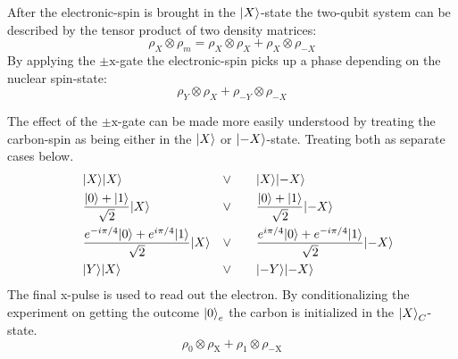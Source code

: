 After the electronic-spin is brought in the ${\left\vert{X}\right\rangle}$-state the two-qubit system can be described by the tensor product of two density matrices:
\begin{equation}
    \rho_X \otimes \rho_m = \rho_X \otimes \rho_{X} +\rho_X \otimes \rho_{-X}
\end{equation}
By applying the $\pm{\mathrm{x}}$-gate  the electronic-spin picks up a phase depending on the nuclear spin-state:
\begin{equation}
     \rho_Y \otimes \rho_{X} +\rho_{-Y} \otimes \rho_{-X}
    \label{eq:density_after_Ren}
\end{equation}

The effect of the $\pm{\mathrm{x}}$-gate can be made more easily understood by treating the carbon-spin as being either in the ${\left\vert{X}\right\rangle}$ or ${\left\vert{-X}\right\rangle}$-state. Treating both as separate cases below.
\begin{align}
    \quad &{\left\vert{X}\right\rangle}{\left\vert{X}\right\rangle} &\vee \quad &  \quad{\left\vert{X}\right\rangle}{\left\vert{-X}\right\rangle}\\
    \quad &\frac{{\left\vert{0}\right\rangle}+{\left\vert{1}\right\rangle}}{\sqrt{2}}{\left\vert{X}\right\rangle} &\vee \quad & \quad \frac{{\left\vert{0}\right\rangle}+{\left\vert{1}\right\rangle}}{\sqrt{2}}{\left\vert{-X}\right\rangle} \\
    \quad &\frac{e^{-i\pi/4}{\left\vert{0}\right\rangle}+e^{i\pi/4}{\left\vert{1}\right\rangle}}{\sqrt{2}}{\left\vert{X}\right\rangle} &\vee \quad & \quad \frac{e^{i\pi/4}{\left\vert{0}\right\rangle}+e^{-i\pi/4}{\left\vert{1}\right\rangle}}{\sqrt{2}}{\left\vert{-X}\right\rangle}\\
    \quad &{\left\vert{Y}\right\rangle}{\left\vert{X}\right\rangle} &\vee \quad & \quad {\left\vert{-Y}\right\rangle}{\left\vert{-X}\right\rangle}
\end{align}
The final x-pulse is used to read out the electron. By conditionalizing the experiment on getting the outcome ${\left\vert{0}\right\rangle}_e$ the carbon is initialized in the ${\left\vert{X}\right\rangle}_C$-state.
\begin{equation}
    \rho_0 \otimes \rho_{\mathrm{X}} + \rho_1 \otimes \rho_{\mathrm{-X}}
\end{equation}

